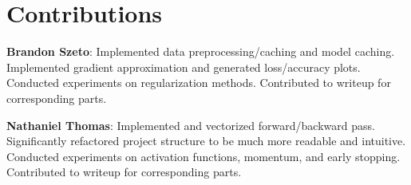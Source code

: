 \section*{Contributions}

\textbf{Brandon Szeto}: Implemented data preprocessing/caching and model caching. Implemented gradient approximation and generated loss/accuracy plots. Conducted experiments on regularization methods. Contributed to writeup for corresponding parts.

\textbf{Nathaniel Thomas}: Implemented and vectorized forward/backward pass. Significantly refactored project structure to be much more readable and intuitive. Conducted experiments on activation functions, momentum, and early stopping. Contributed to writeup for corresponding parts.
